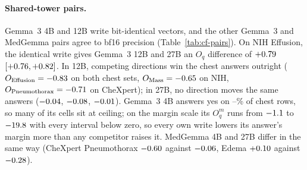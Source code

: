 \documentclass{article}
\begin{document}
\paragraph{Shared-tower pairs.} Gemma~3 4B and 12B write bit-identical vectors, and the other Gemma~3 and MedGemma pairs agree to bf16 precision (Table~\ref{tab:cf-pairs}). On NIH Effusion, the identical write gives Gemma~3 12B and 27B an $O_q$ difference of $+0.79$ $[+0.76,+0.82]$. In 12B, competing directions win the chest answers outright ($O_{\mathrm{Effusion}}=-0.83$ on both chest sets, $O_{\mathrm{Mass}}=-0.65$ on NIH, $O_{\mathrm{Pneumothorax}}=-0.71$ on CheXpert); in 27B, no direction moves the same answers ($-0.04$, $-0.08$, $-0.01$). Gemma~3 4B answers yes on \cfGemmaFourYesMin--\cfGemmaFourYesMax\% of chest rows, so many of its cells sit at ceiling; on the margin scale its $O^m_q$ runs from $-1.1$ to $-19.8$ with every interval below zero, so every own write lowers its answer's margin more than any competitor raises it. MedGemma 4B and 27B differ in the same way (CheXpert Pneumothorax $-0.60$ against $-0.06$, Edema $+0.10$ against $-0.28$).
\end{document}
